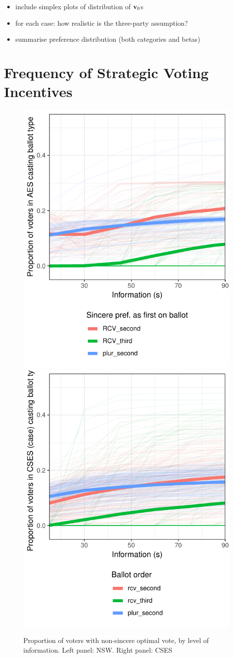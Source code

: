 \documentclass[11pt, letter, margin = 2 in]{article}
\begin{document}
\begin{itemize}
	\item include simplex plots of distribution of ${\bf v}_0$s
	\item for each case: how realistic is the three-party assumption?
	\item summarise preference distribution (both categories and betas)
\end{itemize}

\section{Frequency of Strategic Voting Incentives}

\begin{figure}[!h]
	\centering
	\includegraphics[width = .45 \textwidth]{"../output/figures/australia_sv_freq"}
	\includegraphics[width = .45 \textwidth]{"../output/figures/cses_freq"}
	\caption{Proportion of voters with non-sincere optimal vote, by level of information. Left panel: NSW. Right panel: CSES}
	\label{fig:sv_prop}
\end{figure}
\end{document}
